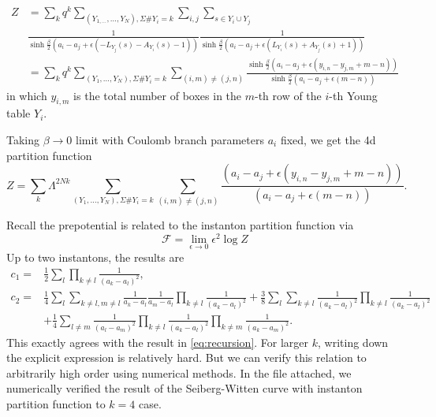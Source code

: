 \documentclass{article}
\begin{document}
\begin{equation}
\begin{aligned}
Z &=\sum_{k} q^{k} \sum_{\left(Y_{1, \ldots}, \ldots, Y_{N}\right), \Sigma \# Y_{i}=k} \sum_{i, j} \sum_{s \in Y_{i} \cup Y_{j}} \\
& \frac{1}{\sinh \frac{\beta}{2}\left(a_{i}-a_{j}+\epsilon\left(-L_{Y_{j}}(s)-A_{Y_{i}}(s)-1\right)\right)} \frac{1}{\sinh \frac{\beta}{2}\left(a_{i}-a_{j}+\epsilon\left(L_{Y_{i}}(s)+A_{Y_{j}}(s)+1\right)\right)} \\
&=\sum_{k} q^{k} \sum_{\left(Y_{1}, \ldots, Y_{N}\right), \Sigma \# Y_{i}=k} \sum_{(i, m) \neq(j, n)} \frac{\sinh \frac{\beta}{2}\left(a_{i}-a_{j}+\epsilon\left(y_{i, n}-y_{j, m}+m-n\right)\right)}{\sinh \frac{\beta}{2}\left(a_{i}-a_{j}+\epsilon(m-n)\right)}
\end{aligned}
\end{equation}
in which $y_{i,m}$ is the total number of boxes in the $m$-th row of the $i$-th Young table $Y_i$. 

Taking $\beta\to 0$ limit with Coulomb branch parameters $a_i$ fixed, we get the 4d partition function
\begin{equation}
Z=\sum_{k} \Lambda^{2 N k} \sum_{\left(Y_{1}, \ldots, Y_{N}\right), \Sigma \# Y_{i}=k} \sum_{(i, m) \neq(j, n)}
\frac{\left(a_{i}-a_{j}+\epsilon\left(y_{i, n}-y_{j, m}+m-n\right)\right)}{\left(a_{i}-a_{j}+\epsilon(m-n)\right)}.
\end{equation}

Recall the prepotential is related to the instanton partition function via
\begin{equation}
\mathscr{F}=\lim _{\epsilon \rightarrow 0} \epsilon^{2} \log Z
\end{equation}
Up to two instantons, the results are 
\begin{equation}
\begin{aligned}
c_1=& \frac{1}{2} \sum_{l} \prod_{k \neq l} \frac{1}{\left(a_{k}-a_{l}\right)^{2}}, \\
c_2=& \frac{1}{4} \sum_{l} \sum_{k \neq l, m \neq l} \frac{1}{a_{k}-a_{l}} \frac{1}{a_{m}-a_{l}} \prod_{k \neq l} \frac{1}{\left(a_{k}-a_{l}\right)^{2}}+\frac{3}{8} \sum_{l} \sum_{k \neq l} \frac{1}{\left(a_{k}-a_{l}\right)^{2}} \prod_{k \neq l} \frac{1}{\left(a_{k}-a_{l}\right)^{2}} \\
&+\frac{1}{4} \sum_{l \neq m} \frac{1}{\left(a_{l}-a_{m}\right)^{2}} \prod_{k \neq l} \frac{1}{\left(a_{k}-a_{l}\right)^{2}} \prod_{k \neq m} \frac{1}{\left(a_{k}-a_{m}\right)^{2}} .
\end{aligned}
\end{equation}
This exactly agrees with the result in \eqref{eq:recursion}. For larger $k$, writing down the explicit expression is relatively hard. But we can verify this relation to arbitrarily high order using numerical methods. In the file attached, we numerically verified the result of the Seiberg-Witten curve with instanton partition function to $k=4$ case.
\end{document}
